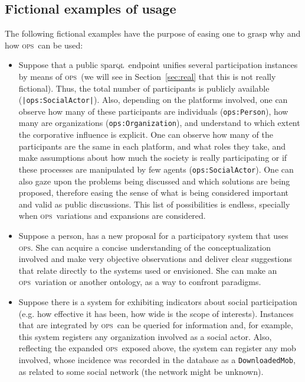 \documentclass[10pt,letterpaper]{article}
\newcommand{\ops}{\textsc{ops}}
\newcommand{\sparql}{\textsc{s}par\textsc{ql}}
\begin{document}
\subsection{Fictional examples of usage}\label{examplesUsage}
The following fictional examples 
have the purpose of easing one to grasp why and how \ops\ can be used:
\begin{itemize}
    \item Suppose that a public \sparql\ endpoint unifies several participation instances by means of \ops\ 
    (we will see in Section~\ref{sec:real} that this is not really fictional).
    Thus, the total number of participants is publicly available ({\tt |ops:SocialActor|}).
    Also, depending on the platforms involved,
    one can observe how many of these participants are individuals ({\tt ops:Person}), 
    how many are organizations ({\tt ops:Organization}),
    and understand to which extent the corporative influence is explicit.
    One can observe how many of the participants are the same in each platform,
    and what roles they take,
    and make assumptions about how much the society is really participating
    or if these processes are manipulated by few agents ({\tt ops:SocialActor}).
    One can also gaze upon the problems being discussed and which solutions are being proposed,
    therefore easing the sense of what is being considered important and valid as public discussions.
    This list of possibilities is endless, specially when \ops\ variations and expansions are considered.
    \item Suppose a person, has a new proposal for a participatory system that uses \ops.
    She can acquire a concise understanding of the conceptualization involved
    and make very objective observations and deliver clear suggestions
    that relate directly to the systems used or envisioned.
    She can make an \ops\ variation or another ontology, as a way to confront paradigms.
    \item Suppose there is a system for exhibiting indicators about social participation 
    (e.g. how effective it has been, how wide is the scope of interests).
    Instances that are integrated by \ops\ can be queried for information and,
    for example, this system registers any organization involved as a social actor.
    Also, reflecting the expanded \ops\ exposed above, the system can register any mob involved,
    whose incidence was recorded in the database as a \texttt{DownloadedMob},
    as related to some social network (the network might be unknown).
\end{itemize}
\end{document}
